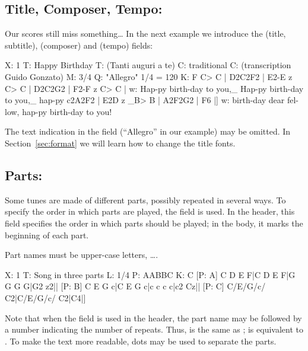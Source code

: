 \documentclass[a4paper,fullpage,12pt]{book}
\begin{document}

\subsection{Title, Composer, Tempo: }

Our scores still miss something{\ldots} In the next example we
introduce the  (title, subtitle),  (composer) and
 (tempo) fields:

\begin{abcsource}
X: 1
T: Happy Birthday     %
T: (Tanti auguri a te)  %
C: traditional        %
C: (transcription Guido Gonzato)
M: 3/4
Q: "Allegro" 1/4 = 120 %
K: F
C> C | D2C2F2 | E2-E z C> C | D2C2G2 | F2-F z C> C |
w: Hap-py birth-day to you,_ Hap-py birth-day to you,_ hap-py
c2A2F2 | E2D z _B> B | A2F2G2 | F6 |]
w: birth-day dear fel-low, hap-py birth-day to you!
\end{abcsource}


The text indication in the  field (``Allegro'' in our
example) may be omitted. In Section~\ref{sec:format} we will learn how
to change the title fonts.


\subsection{Parts: }
\label{sec:parts}


Some tunes are made of different parts, possibly repeated in several
ways. To specify the order in which parts are played, the 
field is used. In the header, this field specifies the order in which
parts should be played; in the body, it marks the beginning of each
part.

Part names must be upper-case letters, \ldots{}.


\begin{abcsource}
X: 1
T: Song in three parts
L: 1/4
P: AABBC %
K: C
[P: A] C D E F|C D E F|G G G G|G2 z2||
[P: B] C E G c|C E G c|c c c c|c2 Cz||
[P: C] C/E/G/c/ C2|C/E/G/c/ C2|C4|]
\end{abcsource}


Note that when the  field is used in the header, the part
name may be followed by a number indicating the number of repeats.
Thus,  is the same as ;  is
equivalent to . To make the text more readable, dots
may be used to separate the parts.
\end{document}
